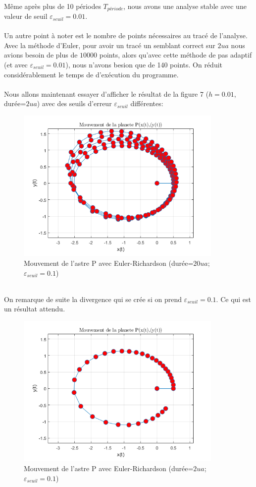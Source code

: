 \documentclass[11pt]{article} %
\begin{document}
\\ Même après plus de 10 périodes $T_{période}$, nous avons une analyse stable avec une valeur de seuil $\varepsilon_{seuil}=0.01$.
\\\\Un autre point à noter est le nombre de points nécessaires au tracé de l'analyse. Avec la méthode d'Euler, pour avoir un tracé un semblant correct sur $2ua$ nous avions besoin de plus de $10 000$ points, alors qu'avec cette méthode de pas adaptif (et avec $\varepsilon_{seuil}=0.01$), nous n'avons besion que de 140 points. On réduit considérablement le temps de d'exécution du programme.
\\\\ Nous allons maintenant essayer d'afficher le résultat de la figure 7 ($h=0.01$, durée=$2ua$) avec des seuils d'erreur $\varepsilon_{seuil}$ différentes:
\begin{figure}[h]
\includegraphics[width=10cm]{fig_euler_rich_3}
\centering
\caption{Mouvement de l'astre P avec Euler-Richardson (durée=$20ua$; $\varepsilon_{seuil}=0.1$)}
\end{figure}
\\ On remarque de suite la divergence qui se crée si on prend $\varepsilon_{seuil} = 0.1$. Ce qui est un résultat attendu.
\begin{figure}[h]
\includegraphics[width=10cm]{fig_euler_rich_4}
\centering
\caption{Mouvement de l'astre P avec Euler-Richardson (durée=$2ua$; $\varepsilon_{seuil}=0.1$)}
\end{figure}
\end{document}
